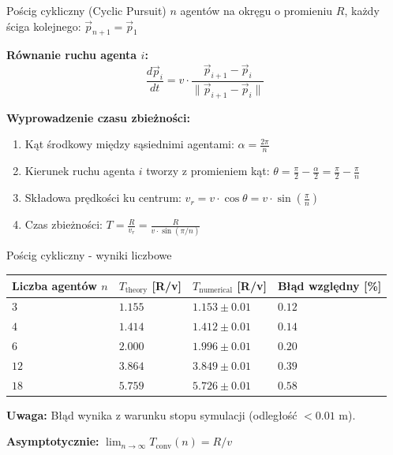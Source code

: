 \documentclass[aspectratio=169,11pt]{beamer}
\newcommand{\tablefontsize}{\fontsize{8}{10}\selectfont}
\begin{document}
\begin{frame}{Pościg cykliczny (Cyclic Pursuit)}
$n$ agentów na okręgu o promieniu $R$, każdy ściga kolejnego: $\vec{p}_{n+1} = \vec{p}_1$

\vspace{0.2cm}
\textbf{Równanie ruchu agenta $i$:}
\begin{equation*}
\frac{d\vec{p}_i}{dt} = v \cdot \frac{\vec{p}_{i+1} - \vec{p}_i}{\|\vec{p}_{i+1} - \vec{p}_i\|}
\end{equation*}

\vspace{0.2cm}
\textbf{Wyprowadzenie czasu zbieżności:}
\begin{enumerate}
    \item Kąt środkowy między sąsiednimi agentami: $\alpha = \frac{2\pi}{n}$
    \item Kierunek ruchu agenta $i$ tworzy z promieniem kąt: $\theta = \frac{\pi}{2} - \frac{\alpha}{2} = \frac{\pi}{2} - \frac{\pi}{n}$
    \item Składowa prędkości ku centrum: $v_r = v \cdot \cos\theta = v \cdot \sin\left(\frac{\pi}{n}\right)$
    \item Czas zbieżności: $T = \frac{R}{v_r} = \frac{R}{v \cdot \sin(\pi/n)}$
\end{enumerate}
\end{frame}

\begin{frame}{Pościg cykliczny - wyniki liczbowe}
\centering
\tablefontsize
\begin{tabular}{@{}llll@{}}
\toprule
\textbf{Liczba agentów $n$} & \textbf{$T_{\text{theory}}$ [R/v]} & \textbf{$T_{\text{numerical}}$ [R/v]} & \textbf{Błąd względny [\%]} \\ \midrule
$3$ & $1.155$ & $1.153 \pm 0.01$ & $0.12$ \\
$4$ & $1.414$ & $1.412 \pm 0.01$ & $0.14$ \\
$6$ & $2.000$ & $1.996 \pm 0.01$ & $0.20$ \\
$12$ & $3.864$ & $3.849 \pm 0.01$ & $0.39$ \\
$18$ & $5.759$ & $5.726 \pm 0.01$ & $0.58$ \\ \bottomrule
\end{tabular}

\vspace{0.5cm}
\normalsize
\textbf{Uwaga:} Błąd wynika z warunku stopu symulacji (odległość $< 0.01$ m).

\vspace{0.2cm}
\textbf{Asymptotycznie:} $\lim_{n \to \infty} T_{\text{conv}}(n) = R/v$
\end{frame}
\end{document}

